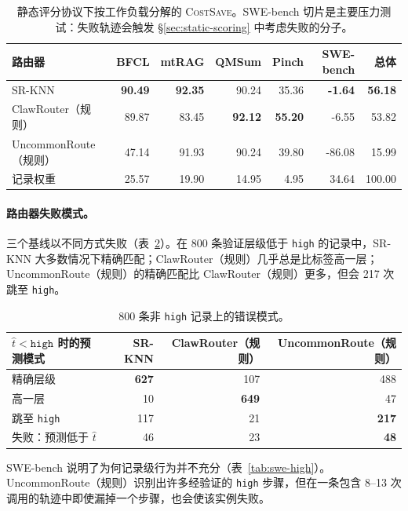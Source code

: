 \begin{table}[ht]
\centering
\scriptsize
\begin{tabular}{lrrrrrr}
\toprule
路由器 & BFCL & mtRAG & QMSum & Pinch & SWE-bench & 总体 \\
\midrule
SR-KNN       & \textbf{90.49} & \textbf{92.35} & 90.24 & 35.36 & \textbf{-1.64} & \textbf{56.18} \\
ClawRouter（规则） & 89.87 & 83.45 & \textbf{92.12} & \textbf{55.20} & -6.55 & 53.82 \\
UncommonRoute（规则） & 47.14 & 91.93 & 90.24 & 39.80 & -86.08 & 15.99 \\
\midrule
记录权重  & 25.57 & 19.90 & 14.95 & 4.95 & 34.64 & 100.00 \\
\bottomrule
\end{tabular}
\caption{静态评分协议下按工作负载分解的 \textsc{CostSave}。SWE-bench 切片是主要压力测试：失败轨迹会触发 \S\ref{sec:static-scoring} 中考虑失败的分子。}
\label{tab:per-benchmark}
\end{table}

\paragraph{路由器失败模式。}
\label{sec:error-patterns}

三个基线以不同方式失败（表~\ref{tab:error-patterns}）。在 800 条验证层级低于 \texttt{high} 的记录中，SR-KNN 大多数情况下精确匹配；ClawRouter（规则）几乎总是比标签高一层；UncommonRoute（规则）的精确匹配比 ClawRouter（规则）更多，但会 217 次跳至 \texttt{high}。

\begin{table}[ht]
\centering
\small
\begin{tabular}{lrrr}
\toprule
$\hat{t}<\texttt{high}$ 时的预测模式 & SR-KNN & ClawRouter（规则） & UncommonRoute（规则） \\
\midrule
精确层级                         & \textbf{627} & 107 & 488 \\
高一层                         & 10 & \textbf{649} & 47 \\
跳至 \texttt{high}               & 117 & 21 & \textbf{217} \\
失败：预测低于 $\hat{t}$     & 46 & 23 & \textbf{48} \\
\bottomrule
\end{tabular}
\caption{800 条非 \texttt{high} 记录上的错误模式。}
\label{tab:error-patterns}
\end{table}

SWE-bench 说明了为何记录级行为并不充分（表~\ref{tab:swe-high}）。UncommonRoute（规则）识别出许多经验证的 \texttt{high} 步骤，但在一条包含 8--13 次调用的轨迹中即使漏掉一个步骤，也会使该实例失败。

